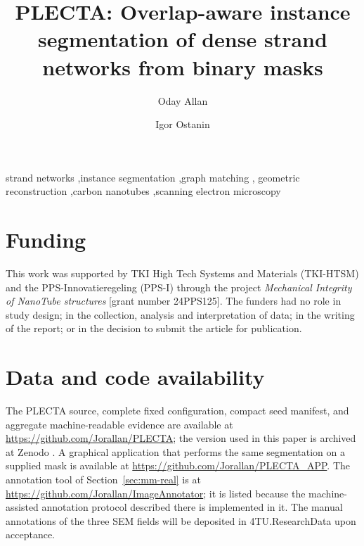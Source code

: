 \documentclass[times, review, 10pt]{elsarticle}
\begin{document}
\begin{frontmatter}

\title{PLECTA: Overlap-aware instance segmentation of dense strand networks
from binary masks}

\author[a]{{\footnotesize Oday Allan}}
\author[a]{{\footnotesize Igor Ostanin}}


\begin{abstract}

\end{abstract}

\begin{keyword}
strand networks \sep instance segmentation \sep graph matching \sep
geometric reconstruction \sep carbon nanotubes \sep scanning electron
microscopy
\end{keyword}

\end{frontmatter}







\section*{Funding}
This work was supported by TKI High Tech Systems and Materials (TKI-HTSM) and
the PPS-Innovatieregeling (PPS-I) through the project \emph{Mechanical
Integrity of NanoTube structures} [grant number 24PPS125]. The funders had no
role in study design; in the collection, analysis and interpretation of data;
in the writing of the report; or in the decision to submit the article for
publication.

\section*{Data and code availability}
The PLECTA source, complete fixed configuration, compact seed manifest,
and aggregate machine-readable evidence are available at
\url{https://github.com/Jorallan/PLECTA}; the version used in this paper is
archived at Zenodo \citep{allan2026plectazenodo}. A graphical application that
performs the same segmentation on a supplied mask is available at
\url{https://github.com/Jorallan/PLECTA_APP}. The
annotation tool of Section~\ref{sec:mm-real} is at
\url{https://github.com/Jorallan/ImageAnnotator}; it is listed because the
machine-assisted annotation protocol described there is implemented in it.
The manual annotations of the three SEM fields will be deposited in
4TU.ResearchData upon acceptance.
\end{document}
